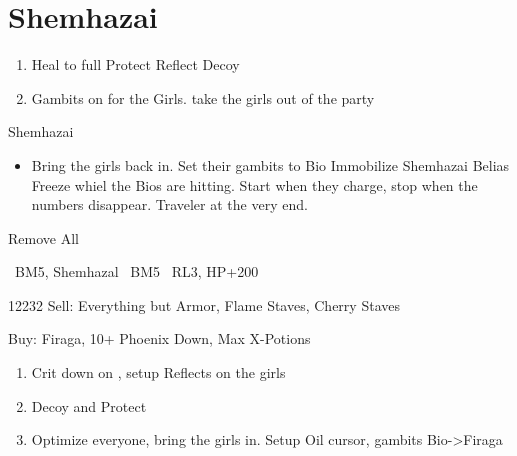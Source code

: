 \chapter{Shemhazai}

\begin{enumerate}
\item Heal \vaan to full
\vaanf Protect \vaan
\penelof Reflect \vaan
\ashef Decoy \vaan
\item Gambits on for the Girls. take the girls out of the party
\end{enumerate}
\begin{battle}{Shemhazai}
\begin{itemize}
\item Bring the girls back in. Set their gambits to Bio
\vaanf Immobilize Shemhazai
\vaanf Belias Freeze whiel the Bios are hitting. Start when they charge, stop when the numbers disappear.
\vaanf Traveler at the very end.
\end{itemize}
\end{battle}
\begin{equip}
Remove All
\end{equip}
\begin{liscense}
\ashe\ BM5, Shemhazal
\penelo\ BM5
\vaan\ RL3, HP+200
\end{liscense}
\begin{shop}{12232}
Sell: Everything but Armor, Flame Staves, Cherry Staves

Buy: Firaga, 10+ Phoenix Down, Max X-Potions
\end{shop}
\begin{enumerate}
\item Crit down on \penelo, setup Reflects on the girls
\item Decoy and Protect \vaan
\item Optimize everyone, bring the girls in. Setup Oil cursor, gambits Bio->Firaga
\end{enumerate}
